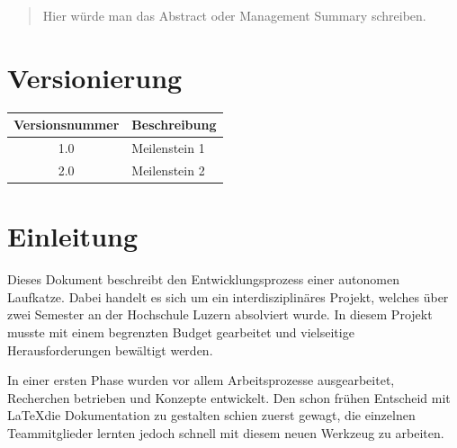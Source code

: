 \documentclass[a4paper]{report}
\begin{document}
\newpage

\begin{abstract}
	Hier würde man das Abstract oder Management Summary schreiben.
\end{abstract}

\chapter*{Versionierung}
\label{ch*:Vers}
\vspace{2em}

\noindent
\begin{tabular}{|c|p{}|}
	\hline
	\textbf{Versionsnummer} & \textbf{Beschreibung}\\
	\hline
	1.0 & Meilenstein 1 \\
	\hline
	2.0 & Meilenstein 2 \\
	\hline
\end{tabular}

\tableofcontents

\newpage


\chapter{Einleitung}
\label{ch:Intro}
Dieses Dokument beschreibt den Entwicklungsprozess einer autonomen Laufkatze. Dabei handelt es sich um ein interdisziplinäres Projekt, welches über zwei Semester an der Hochschule Luzern absolviert wurde. In diesem Projekt musste mit einem begrenzten Budget gearbeitet und vielseitige Herausforderungen bewältigt werden.

In einer ersten Phase wurden vor allem Arbeitsprozesse ausgearbeitet, Recherchen betrieben und Konzepte entwickelt. Den schon frühen Entscheid mit \LaTeX  die Dokumentation zu gestalten schien zuerst gewagt, die einzelnen Teammitglieder lernten jedoch schnell mit diesem neuen Werkzeug zu arbeiten.
\end{document}
